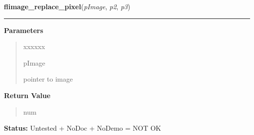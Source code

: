 \hspace{.8\funcindent}\begin{boxedminipage}{\funcwidth}

    \raggedright \textbf{flimage\_replace\_pixel}(\textit{pImage}, \textit{p2}, \textit{p3})

    \vspace{-1.5ex}

    \rule{\textwidth}{0.5\fboxrule}
\setlength{\parskip}{2ex}
\setlength{\parskip}{1ex}
      \textbf{Parameters}
      \vspace{-1ex}

      \begin{quote}
        \begin{Ventry}{xxxxxx}

          \item[pImage]

          pointer to image

        \end{Ventry}

      \end{quote}

      \textbf{Return Value}
    \vspace{-1ex}

      \begin{quote}
      num

      \end{quote}

\textbf{Status:} Untested + NoDoc + NoDemo = NOT OK



    \end{boxedminipage}

    \label{xformslib:flflimage:flimage_transform_pixels}

    \vspace{0.5ex}

